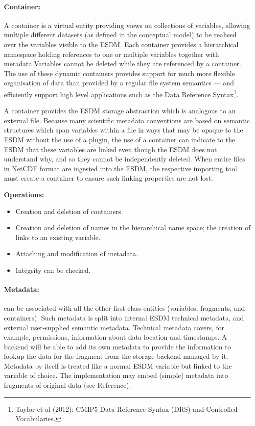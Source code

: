 \paragraph{Container:} A container is a virtual entity providing views on collections of variables, allowing multiple different datasets (as defined in the conceptual model) to be realised over the variables visible to the ESDM.  Each container provides a hierarchical namespace holding references to one or multiple variables together with metadata.Variables cannot be deleted while they are referenced by a container.  The use of these dynamic containers provides support for much more flexible organisation of data than provided by a regular file system semantics --- and efficiently support high level applications such as the Data Reference Syntax\footnote{Taylor et al (2012): CMIP5 Data Reference Syntax (DRS) and
Controlled Vocabularies.}.

A container provides the ESDM storage abstraction which is analogous to an external file. Because many scientific metadata conventions are based on semantic structures which span variables within a file in ways that may be opaque to the ESDM without the use of a plugin, the use of a container can indicate to the ESDM that these variables are linked even though the ESDM does not understand why, and so they cannot be independently deleted.
When entire files in NetCDF format are ingested into the ESDM, the respective importing tool must create  a container to ensure such linking properties are not lost.

\textbf{Operations:}
\begin{itemize}
	\item Creation and deletion of containers.
	\item Creation and deletion of names in the hierarchical name space; the creation of links to an existing variable.
	\item Attaching and modification of metadata.
	\item Integrity can be checked.
\end{itemize}

\paragraph{Metadata:} can be associated with all the other first class entities (variables, fragments, and containers). Such metadata is split into internal ESDM technical metadata, and external user-supplied semantic metadata.
Technical metadata covers, for example, permissions, information about data location and timestamps.
A backend will be able to add its own metadata to provide the information to lookup the data for the fragment from the storage backend managed by it.
Metadata by itself is treated like a normal ESDM variable but linked to the variable of choice.
The implementation may embed (simple) metadata into fragments of original data (see Reference).

